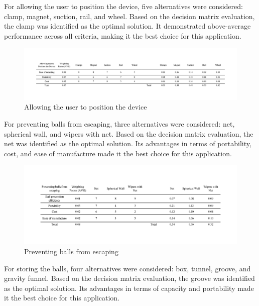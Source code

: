 \documentclass[12pt]{article}
\begin{document}
For allowing the user to position the device, five alternatives were considered: clamp, magnet, suction, rail, and wheel. Based on the decision matrix evaluation, the clamp was identified as the optimal solution. It demonstrated above-average performance across all criteria, making it the best choice for this application.

\begin{figure}[H]
    \centering
    \includegraphics[width=1\textwidth]{Decision matrices/position device.png}
    \caption{Allowing the user to position the device}
\end{figure}

For preventing balls from escaping, three alternatives were considered: net, spherical wall, and wipers with net. Based on the decision matrix evaluation, the net was identified as the optimal solution. Its advantages in terms of portability, cost, and ease of manufacture made it the best choice for this application.

\begin{figure}[H]
    \centering
    \includegraphics[width=1\textwidth]{Decision matrices/prevent escaping.png}
    \caption{Preventing balls from escaping}
\end{figure}

For storing the balls, four alternatives were considered: box, tunnel, groove, and gravity funnel. Based on the decision matrix evaluation, the groove was identified as the optimal solution. Its advantages in terms of capacity and portability made it the best choice for this application.
\end{document}
